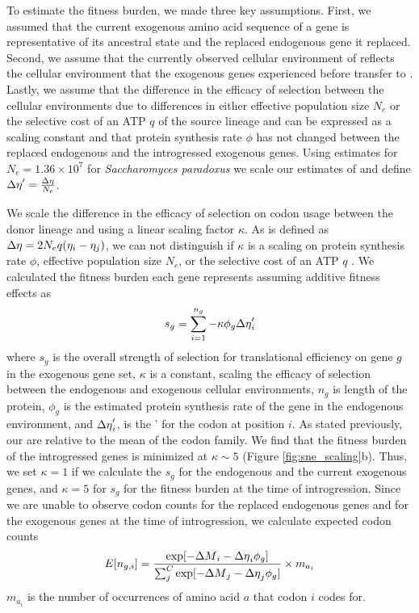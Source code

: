 To estimate the fitness burden, we made three key assumptions.
First, we assumed that the current exogenous amino acid sequence of a gene is representative of its ancestral state and the replaced endogenous gene it replaced.
Second, we assume that the currently observed cellular environment of \gossypii reflects the cellular environment that the exogenous genes experienced before transfer to \kluyveri.
Lastly, we assume that the difference in the efficacy of selection between the cellular environments due to differences in either effective population size $N_e$ or the selective cost of an ATP $q$ of the source lineage and \kluyveri can be expressed as a scaling constant and that protein synthesis rate $\phi$ has not changed between the replaced endogenous and the introgressed exogenous genes.
Using estimates for $N_e = 1.36\times10^7$ \citep{wagner2005} for \textit{Saccharomyces paradoxus} we scale our estimates of \DE and define ${\Delta \eta}' = \frac{{\Delta \eta}}{N_e}$.

We scale the difference in the efficacy of selection on codon usage between the donor lineage and \kluyveri using a linear scaling factor $\kappa$.
As \DE is defined as ${\Delta \eta} = 2N_eq(\eta_i-\eta_j)$, we can not distinguish if $\kappa$ is a scaling on protein synthesis rate $\phi$, effective population size $N_e$, or the selective cost of an ATP $q$ \citep{gilchrist2007, gilchrist2015}.
We calculated the fitness burden each gene represents assuming additive fitness effects as 
\begin{equation}
s_g = \sum_{i=1}^{n_g} -\kappa \phi_g {\Delta \eta}'_i 
\end{equation}
where $s_g$ is the overall strength of selection for translational efficiency on gene $g$  in the exogenous gene set, $\kappa$ is a constant, scaling the efficacy of selection between the endogenous and exogenous cellular environments, $n_{g}$ is length of the protein, $\phi_g$ is the estimated protein synthesis rate of the gene in the endogenous environment, and ${\Delta \eta}'_i$, is the \DE' for the codon at position $i$.
As stated previously, our \DE are relative to the mean of the codon family.
We find that the fitness burden of the introgressed genes  is minimized at $\kappa \sim 5$ (Figure \ref{fig:sne_scaling}b).
Thus, we set $\kappa = 1$ if we calculate the $s_g$ for the endogenous and the current exogenous genes, and $\kappa = 5$ for $s_g$ for the fitness burden at the time of introgression.
Since we are unable to observe codon counts for the replaced endogenous genes and for the exogenous genes at the time of introgression, we calculate expected codon counts
\begin{equation}
E[n_{g,i}] = \frac{\exp[-{\Delta M}_i -{\Delta \eta}_i\phi_g]}{\sum_j^C \exp[-{\Delta M}_j -{\Delta \eta}_j\phi_g]}\times m_{a_i}
\end{equation} 
$m_{a_i}$ is the number of occurrences of amino acid $a$ that codon $i$ codes for.

